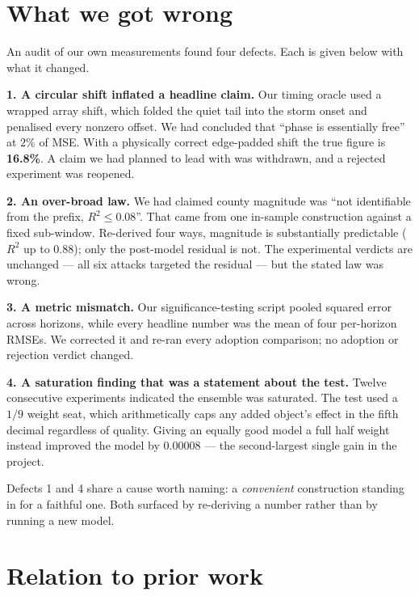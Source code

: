 \documentclass[10pt,letterpaper,twocolumn]{article}
\begin{document}
\section{What we got wrong}
\label{sec:wrong}

An audit of our own measurements found four defects. Each is given below with
what it changed.

\textbf{1. A circular shift inflated a headline claim.} Our timing oracle used a
wrapped array shift, which folded the quiet tail into the storm onset and
penalised every nonzero offset. We had concluded that ``phase is essentially
free'' at $2\%$ of MSE. With a physically correct edge-padded shift the true
figure is \textbf{16.8\%}. A claim we had planned to lead with was withdrawn, and
a rejected experiment was reopened.

\textbf{2. An over-broad law.} We had claimed county magnitude was
``not identifiable from the prefix, $R^2 \le 0.08$''. That came from one
in-sample construction against a fixed sub-window. Re-derived four ways, magnitude
is substantially predictable ($R^2$ up to $0.88$); only the post-model residual is
not. The experimental verdicts are unchanged --- all six attacks targeted the
residual --- but the stated law was wrong.

\textbf{3. A metric mismatch.} Our significance-testing script pooled squared
error across horizons, while every headline number was the mean of four
per-horizon RMSEs. We corrected it and re-ran every adoption comparison; no
adoption or rejection verdict changed.

\textbf{4. A saturation finding that was a statement about the test.} Twelve
consecutive experiments indicated the ensemble was saturated. The test used a
$1/9$ weight seat, which arithmetically caps any added object's effect in the
fifth decimal regardless of quality. Giving an equally good model a full half
weight instead improved the model by $0.00008$ --- the second-largest single gain
in the project.

Defects 1 and 4 share a cause worth naming: a \emph{convenient} construction
standing in for a faithful one. Both surfaced by re-deriving a number rather
than by running a new model.

\section{Relation to prior work}
\label{sec:prior}
\end{document}
